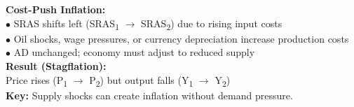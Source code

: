 \documentclass[11pt, a4paper, twoside]{book}
\begin{document}
\begin{diagrambox}
{%
}{%
\textbf{\color{NavyPrimary}Cost-Push Inflation:}\\[4pt]
$\bullet$ SRAS shifts left (SRAS\textsubscript{1} $\to$ SRAS\textsubscript{2}) due to rising input costs\\[2pt]
$\bullet$ Oil shocks, wage pressures, or currency depreciation increase production costs\\[2pt]
$\bullet$ AD unchanged; economy must adjust to reduced supply\\[4pt]
\textbf{\color{NavyPrimary}Result (Stagflation):}\\[2pt]
Price rises (P\textsubscript{1} $\to$ P\textsubscript{2}) but output falls (Y\textsubscript{1} $\to$ Y\textsubscript{2})\\[4pt]
\textbf{\color{GoldAccent}Key:} Supply shocks can create inflation without demand pressure.%
}
\end{diagrambox}
\end{document}
